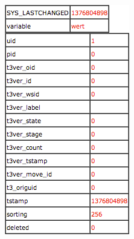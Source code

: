 \begin{frame}[fragile]
\begin{columns}[T]
		\begin{column}{.4\textwidth}
			\begin{figure}\vspace*{-0.4cm}
				\includegraphics[width=0.6\linewidth]{Images/TypoScript/DebugRegisterAndPage.png}
			\end{figure}
		\end{column}

	\end{columns}

\end{frame}


